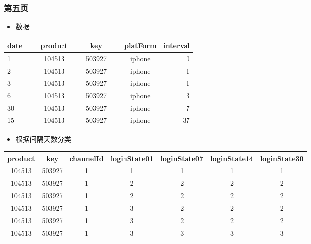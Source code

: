 \documentclass[notheorems,mathserif,table,Singapore]{beamer}
\begin{document}
\begin{frame}[shrink=10]
\frametitle{第五页}
\begin{itemize}
\item \small 数据
\end{itemize}
\begin{table}[h]\tiny
\begin{tabular}{l c c c c c c r}
\hline
date &\ & product & \ & key &\ & platForm & interval\\
\hline
1		 &\  & 104513 &\ 	& 503927 &\ 	&  iphone &0\\
2   &\  & 104513 &\    & 503927 &\ 	&  iphone &1\\
3 	 &\  & 104513 &\    & 503927 &\ 	&  iphone & 1\\
6   &\  & 104513 &\    & 503927 &\ 	&  iphone &3\\
30   &\  & 104513 &\    & 503927 &\ 	&  iphone &7\\
15 &\  & 104513 &\    & 503927 &\ 	&  iphone &37\\
\hline
\end{tabular}

\end{table}
\begin{itemize}
\item \small 根据间隔天数分类
\end{itemize}
\begin{table}\tiny
\begin{tabular}{c  c c c c c c }
\hline
product & key & channelId &  loginState01 & loginState07 & loginState14 & loginState30 \\
\hline
104513 & 503927 & 1   &       1      &     1        &    1  &    1\\ 
104513 & 503927 & 1   &       2      &     2        &    2  &    2\\  
104513 & 503927 & 1   &       2      &     2        &    2  &    2\\   
104513 & 503927 & 1   &       3      &     2        &    2  &    2\\ 
104513 & 503927 & 1   &       3      &     2        &    2  &    2\\ 
104513 & 503927 & 1   &       3      &     3        &    3  &    3\\ 
\hline
\end{tabular}
\end{table}
\end{frame}
\end{document}
